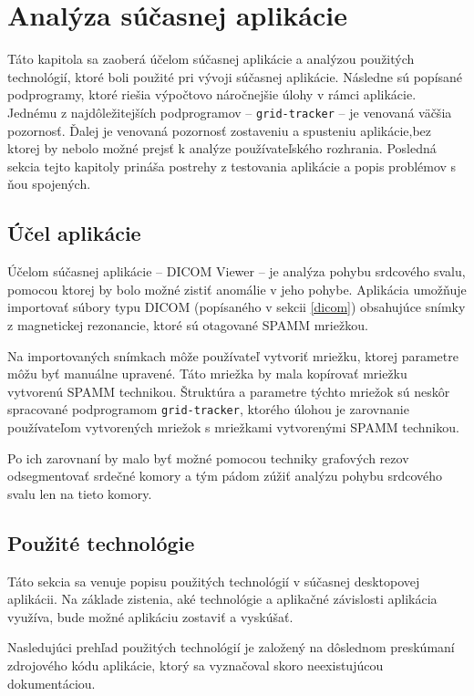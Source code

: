 \chapter {Analýza súčasnej aplikácie}
Táto kapitola sa zaoberá účelom súčasnej aplikácie a analýzou použitých technológií, ktoré boli použité pri vývoji súčasnej aplikácie. Následne sú popísané podprogramy, ktoré riešia výpočtovo náročnejšie úlohy v rámci aplikácie. Jednému z najdôležitejších podprogramov -- \texttt{grid-tracker} -- je venovaná väčšia pozornosť. Ďalej je venovaná pozornosť zostaveniu a spusteniu aplikácie,\newline bez ktorej by nebolo možné prejsť k analýze používateľského rozhrania. \newline Posledná sekcia tejto kapitoly prináša postrehy z testovania aplikácie a popis problémov s ňou spojených.

\section {Účel aplikácie}
Účelom súčasnej aplikácie -- DICOM Viewer -- je analýza pohybu srdcového svalu, pomocou ktorej by bolo možné zistiť anomálie v jeho pohybe. Aplikácia umožňuje importovať súbory typu DICOM (popísaného v sekcii \ref{dicom}) obsahujúce snímky z magnetickej rezonancie, ktoré sú otagované SPAMM mriežkou.

Na importovaných snímkach môže používateľ vytvoriť mriežku, ktorej parametre môžu byť manuálne upravené. Táto mriežka by mala kopírovať mriežku vytvorenú SPAMM technikou. Štruktúra a parametre týchto mriežok sú neskôr spracované podprogramom \texttt{grid-tracker}, ktorého úlohou je zarovnanie používateľom vytvorených mriežok s mriežkami vytvorenými SPAMM technikou.

\clearpage
Po ich zarovnaní by malo byť možné pomocou techniky grafových rezov odsegmentovať srdečné komory a tým pádom zúžiť analýzu pohybu srdcového svalu len na tieto komory.

\section {Použité technológie}
Táto sekcia sa venuje popisu použitých technológií v súčasnej desktopovej aplikácii. Na základe zistenia, aké technológie a aplikačné závislosti aplikácia využíva, bude možné aplikáciu zostaviť a vyskúšať.

Nasledujúci prehľad použitých technológií je založený na dôslednom preskúmaní zdrojového kódu aplikácie, ktorý sa vyznačoval skoro neexistujúcou dokumentáciou.

